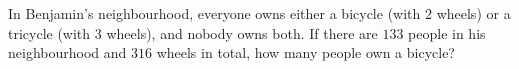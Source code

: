 In Benjamin's neighbourhood, everyone owns either a bicycle (with $2$ wheels) or a tricycle (with $3$ wheels), and nobody owns both. If there are $133$ people in his neighbourhood and $316$ wheels in total, how many people own a bicycle?
